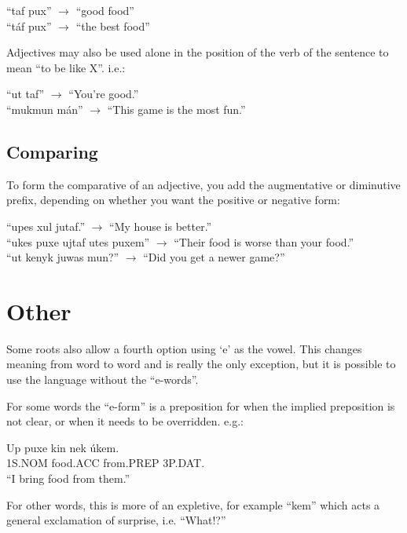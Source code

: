 \documentclass{book}
\begin{document}
\begin{center}
    ``taf pux'' $\rightarrow$ ``good food'' \\
    ``táf pux'' $\rightarrow$ ``the best food''
\end{center}

Adjectives may also be used alone in the position of the verb of the sentence to mean ``to be like X''. i.e.:

\begin{center}
    ``ut taf'' $\rightarrow$ ``You're good.'' \\
    ``mukmun mán'' $\rightarrow$ ``This game is the most fun.''
\end{center}

\subsection{Comparing}
To form the comparative of an adjective, you add the augmentative or diminutive prefix, depending
on whether you want the positive or negative form:

\begin{center}
    ``upes xul jutaf.'' $\rightarrow$ ``My house is better.'' \\
    ``ukes puxe ujtaf utes puxem'' $\rightarrow$ ``Their food is worse than your food.'' \\
    ``ut kenyk juwas mun?'' $\rightarrow$ ``Did you get a newer game?''
\end{center}


\section{Other}
Some roots also allow a fourth option using `e' as the vowel. This changes meaning from word to word
and is really the only exception, but it is possible to use the language without the ``e-words''.

For some words the ``e-form'' is a preposition for when the implied preposition is not clear, or when
it needs to be overridden. e.g.:

\begin{exe}
    \ex
    \gll Up puxe kin nek úkem.\\
    1S.NOM food.ACC from.PREP 3P.DAT. \\
    \glt ``I bring food from them.''
\end{exe}

For other words, this is more of an expletive, for example ``kem'' which acts a general exclamation
of surprise, i.e. ``What!?''
\end{document}
